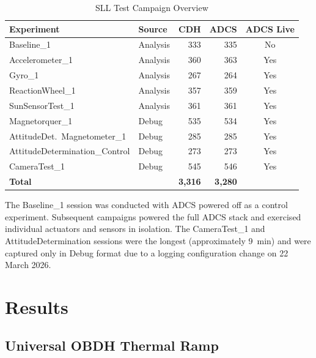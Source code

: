 \documentclass[conference]{IEEEtran}
\begin{document}
\begin{table}[t]
\caption{SLL Test Campaign Overview}
\label{tab:experiments}
\centering
\footnotesize
\begin{tabular}{@{}llrrc@{}}
\toprule
\textbf{Experiment} & \textbf{Source} & \textbf{CDH} & \textbf{ADCS} & \textbf{ADCS Live} \\
\midrule
Baseline\_1                       & Analysis & 333  & 335  & No  \\
Accelerometer\_1                  & Analysis & 360  & 363  & Yes \\
Gyro\_1                           & Analysis & 267  & 264  & Yes \\
ReactionWheel\_1                  & Analysis & 357  & 359  & Yes \\
SunSensorTest\_1                  & Analysis & 361  & 361  & Yes \\
Magnetorquer\_1                   & Debug    & 535  & 534  & Yes \\
AttitudeDet.\ Magnetometer\_1     & Debug    & 285  & 285  & Yes \\
AttitudeDetermination\_Control    & Debug    & 273  & 273  & Yes \\
CameraTest\_1                     & Debug    & 545  & 546  & Yes \\
\midrule
\textbf{Total}                    &          & \textbf{3{,}316} & \textbf{3{,}280} & \\
\bottomrule
\end{tabular}
\end{table}

The Baseline\_1 session was conducted with ADCS powered off as a
control experiment.  Subsequent campaigns powered the full ADCS stack
and exercised individual actuators and sensors in isolation.  The
CameraTest\_1 and AttitudeDetermination sessions were the longest
(approximately \SI{9}{\minute}) and were captured only in Debug
format due to a logging configuration change on 22 March 2026.

\section{Results}
\label{sec:results}

\subsection{Universal OBDH Thermal Ramp}
\end{document}
